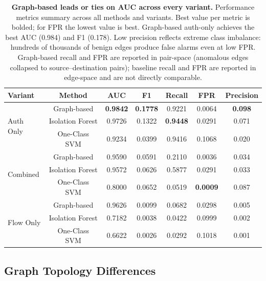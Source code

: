 \documentclass[letterpaper,twocolumn,10pt]{article}
\begin{document}
\begin{table}[h]
\centering
\footnotesize
\setlength{\tabcolsep}{4pt}
\begin{tabular}{lcccccc}
\toprule
Variant & Method & AUC & F1 & Recall & FPR & Precision \\
\midrule
\multirow{3}{*}{Auth Only}
  & Graph-based      & \textbf{0.9842} & \textbf{0.1778} & 0.9221          & 0.0064          & \textbf{0.098} \\
  & Isolation Forest & 0.9726          & 0.1322          & \textbf{0.9448} & 0.0291          & 0.071          \\
  & One-Class SVM    & 0.9234          & 0.0399          & 0.9416          & 0.1068          & 0.020          \\
\midrule
\multirow{3}{*}{Combined}
  & Graph-based      & 0.9590          & 0.0591          & 0.2110          & 0.0036          & 0.034          \\
  & Isolation Forest & 0.9572          & 0.0626          & 0.5877          & 0.0291          & 0.033          \\
  & One-Class SVM    & 0.8000          & 0.0652          & 0.0519          & \textbf{0.0009} & 0.087          \\
\midrule
\multirow{3}{*}{Flow Only}
  & Graph-based      & 0.9626          & 0.0099          & 0.0682          & 0.0298          & 0.005          \\
  & Isolation Forest & 0.7182          & 0.0038          & 0.0422          & 0.0999          & 0.002          \\
  & One-Class SVM    & 0.6622          & 0.0026          & 0.0292          & 0.1018          & 0.001          \\
\bottomrule
\end{tabular}
\caption{\textbf{Graph-based leads or ties on AUC across every variant.} Performance metrics summary across all methods and variants. Best value per metric is bolded; for FPR the lowest value is best. Graph-based auth-only achieves the best AUC (0.984) and F1 (0.178). Low precision reflects extreme class imbalance: hundreds of thousands of benign edges produce false alarms even at low FPR. Graph-based recall and FPR are reported in pair-space (anomalous edges collapsed to source--destination pairs); baseline recall and FPR are reported in edge-space and are not directly comparable.}
\label{tab:metrics_summary}
\end{table}

\subsection{Graph Topology Differences}
\end{document}
